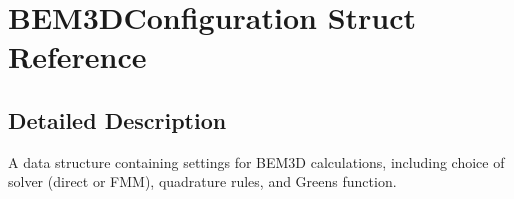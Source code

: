 \section{B\+E\+M3\+D\+Configuration Struct Reference}
\label{structBEM3DConfiguration}


\subsection{Detailed Description}
A data structure containing settings for B\+E\+M3D calculations, including choice of solver (direct or F\+MM), quadrature rules, and Green\textquotesingle{}s function. 